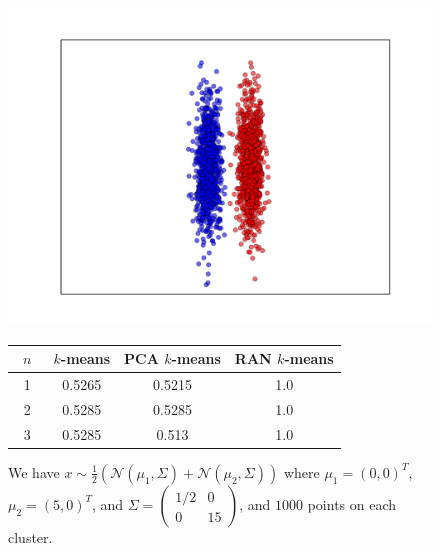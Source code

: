 \documentclass[aps,preprint,nofootinbib,floatfix]{revtex4-1}
\begin{document}
\begin{figure}
\begin{minipage}{.49\textwidth}
\includegraphics[scale=.45]{2d_cigar.pdf}
\end{minipage}
\begin{minipage}{.49\textwidth}
\begin{tabular}{ c | c | c | c }
~$n$~ & $k$-means & PCA $k$-means & RAN $k$-means \\
\hline
1 & 0.5265 & 0.5215 & 1.0 \\
2 & 0.5285 & 0.5285 & 1.0 \\
3 & 0.5285 & 0.513 & 1.0 \\
\hline
\end{tabular}
\end{minipage}
\caption{\label{fig:2d_gauss_sep}
We have $x \sim \tfrac{1}{2}\left( \mathcal{N}(\mu_1, \Sigma) +
\mathcal{N}(\mu_2, \Sigma)\right)$ where $\mu_1 = (0,0)^T$, $\mu_2=(5,0)^T$,
and $\Sigma = \left( \begin{smallmatrix} 1/2 & 0 \\ 0 & 15 \end{smallmatrix}
\right)$,
and $1000$ points on each cluster.
}
\end{figure}
\end{document}
